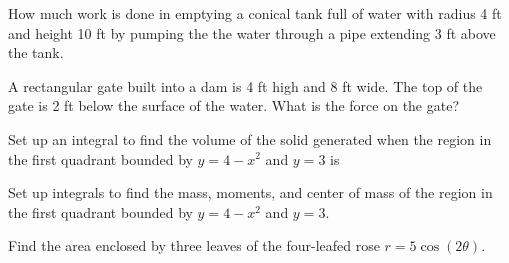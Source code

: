 \documentclass[12pt]{exam}
\begin{document}
\begin{questions}


\question How much work is done in emptying a conical tank full of water with 
radius 4 ft and height 10 ft by pumping the the water through a 
pipe extending 3 ft above the tank.  


\question A rectangular gate built into a dam is 4 ft high and 8 ft wide.
The top of the gate is 2 ft below the surface of the water.  What is the 
force on the gate?




\question Set up an integral to find the volume of the solid generated when
the region in the first quadrant bounded by $y=4-x^2$ and $y=3$ is

\question Set up integrals to find the mass, moments, and center of mass of the
region in the first quadrant bounded by $y=4-x^2$ and $y=3$.

\question Find the area enclosed by three leaves
of the four-leafed rose $r=5\cos(2\theta)$.
\vspace{.2in}


\end{questions}
\end{document}
